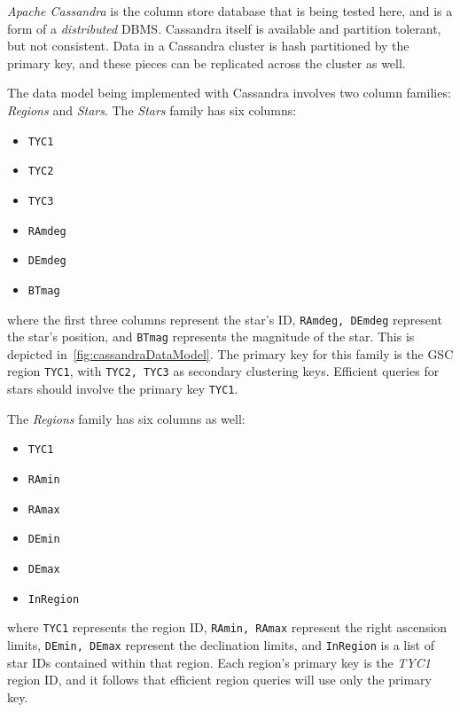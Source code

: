 \textit{Apache Cassandra} is the column store database that is being tested here, and is a form of a
\textit{distributed} DBMS\@.
Cassandra itself is available and partition tolerant, but not consistent.
Data in a Cassandra cluster is hash partitioned by the primary key, and these pieces can be replicated across the
cluster as well.

The data model being implemented with Cassandra involves two column families: \textit{Regions} and \textit{Stars}.
The \textit{Stars} family has six columns:
\begin{multicols}{3}
    \begin{itemize}
        \item[] \texttt{TYC1}
        \item[] \texttt{TYC2}
        \item[] \texttt{TYC3}
        \item[] \texttt{RAmdeg}
        \item[] \texttt{DEmdeg}
        \item[] \texttt{BTmag}
    \end{itemize}
\end{multicols}
where the first three columns represent the star's ID, \texttt{RAmdeg, DEmdeg} represent the star's position, and
\texttt{BTmag} represents the magnitude of the star.
This is depicted in~\autoref{fig:cassandraDataModel}.
The primary key for this family is the GSC region \texttt{TYC1}, with \texttt{TYC2, TYC3} as secondary clustering
keys.
Efficient queries for stars should involve the primary key \texttt{TYC1}.

The \textit{Regions} family has six columns as well:
\begin{multicols}{3}
    \begin{itemize}
        \item[] \texttt{TYC1}
        \item[] \texttt{RAmin}
        \item[] \texttt{RAmax}
        \item[] \texttt{DEmin}
        \item[] \texttt{DEmax}
        \item[] \texttt{InRegion}
    \end{itemize}
\end{multicols}
where \texttt{TYC1} represents the region ID, \texttt{RAmin, RAmax} represent the right ascension limits,
\texttt{DEmin, DEmax} represent the declination limits, and \texttt{InRegion} is a list of star IDs contained within
that region.
Each region's primary key is the \textit{TYC1} region ID, and it follows that efficient region queries will use only
the primary key.

